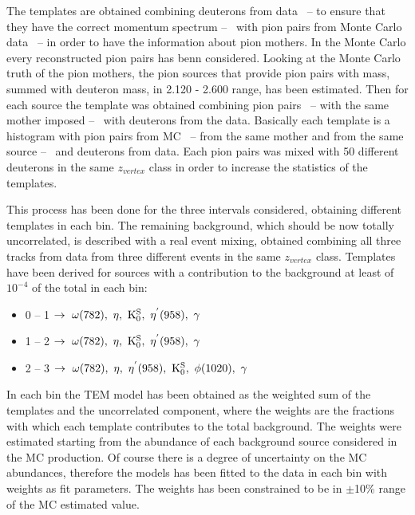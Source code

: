 The templates are obtained combining deuterons from data \ -- to ensure that they have the correct momentum spectrum 
-- \ with pion pairs from Monte Carlo data \ -- in order to have the information about pion mothers.
In the Monte Carlo every reconstructed pion pairs has benn considered.
Looking at the Monte Carlo truth of the pion mothers, the pion sources that provide pion pairs with mass, summed with
deuteron mass, in 2.120 - 2.600 \gevcs range, has been estimated.
Then for each source the template was obtained combining pion pairs \ -- with the same mother imposed -- \ 
with deuterons from the data. 
Basically each template is a \minv histogram with pion pairs from MC \ -- from the same mother and from the same source -- \ 
and deuterons from data. 
Each pion pairs was mixed with 50 different deuterons in the same $z_{vertex}$ class in order to increase the statistics
of the templates.

This process has been done for the three \pt intervals considered, obtaining different templates in each \pt bin.
The remaining background, which should be now totally uncorrelated, is described with a real event mixing, obtained 
combining all three tracks from data from three different events in the same $z_{vertex}$ class.
Templates have been derived for sources with a contribution to the background at least of $10^{-4}$ of the total in each 
\pt bin:
\begin{itemize}
  \item[] 0 -- 1 \gevc $\rightarrow \ \omega(782),\ \eta,\ \rm K_{0}^{S},\ \eta^{'}(958),\ \gamma $
  \item[] 1 -- 2 \gevc $\rightarrow \ \omega(782),\ \eta,\ \rm K_{0}^{S},\ \eta^{'}(958),\ \gamma $
  \item[] 2 -- 3 \gevc $\rightarrow \ \omega(782),\ \eta,\ \eta^{'}(958),\ \rm K_{0}^{S},\ \phi(1020),\ \gamma $
\end{itemize}

In each \pt bin the TEM model has been obtained as the weighted sum of the templates and the uncorrelated component,
where the weights are the fractions with which each template contributes to the total background.
The weights were estimated starting from the abundance of each background source considered in the MC production.
Of course there is a degree of uncertainty on the MC abundances, therefore the models has been fitted to the data in each
\pt bin with weights as fit parameters. The weights has been constrained to be in $\pm$10\% range of the MC estimated value.

